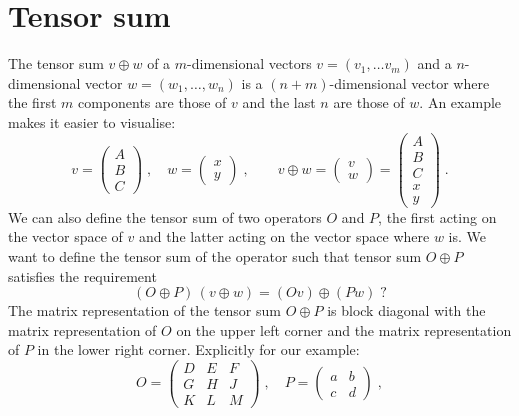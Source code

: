\documentclass[12pt]{article}
\begin{document}
\clearpage
\appendix
{}%
\renewcommand*{\thepage}{A\arabic{page}}
%
\section{Tensor sum}
The tensor sum $v\oplus w$ of a $m$-dimensional vectors $v=(v_1,\dots v_m)$ and a $n$-dimensional vector $w=(w_1,\dots,w_n)$ is a $(n+m)$-dimensional vector where the first $m$ components are those of $v$ and the last $n$ are those of $w$. An example makes it easier to visualise:
\[
v=\left(\begin{array}{c}A\\B\\C\end{array}\right)\;,\quad
w=\left(\begin{array}{c}x\\y\end{array}\right)\;,\qquad
v\oplus w=\left(\begin{array}{c}v\\w\end{array}\right)=\left(\begin{array}{c}A\\B\\C\\x\\y\end{array}\right)\;.  
\] 
We can also define the tensor sum of two operators $O$ and $P$, the first acting on the vector space of $v$ and the latter acting on the vector space where $w$ is. We want to define the tensor sum of the operator such that  tensor sum $O\oplus P$ satisfies the requirement
\[(O\oplus P) \,(v\oplus w) = (Ov)\oplus (Pw)\;?\] 
The matrix representation of the tensor sum $O\oplus P$ is block diagonal with the matrix representation of $O$ on the upper left corner and the matrix representation of $P$ in the lower right corner. Explicitly for our example:
\[O=
\left(\begin{array}{ccc}
D&E&F\\
G&H&J\\
K&L&M
\end{array}\right)
\;,\quad
P=
\left(\begin{array}{cc}
a&b\\
c&d
\end{array}\right)\;,
\]
\end{document}
